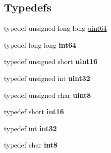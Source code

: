 \subsection*{Typedefs}
\begin{DoxyCompactItemize}
\item 
typedef unsigned long long \hyperlink{namespacedlib_a61113f8b6b3e4ccb66deca9355c8f65d}{uint64}
\item 
\hypertarget{namespacedlib_a8abf353ac58a13a17a60949929cc8a49}{
typedef long long {\bfseries int64}}
\label{namespacedlib_a8abf353ac58a13a17a60949929cc8a49}

\item 
\hypertarget{namespacedlib_a609c073ecd62413ae2c606909abf62be}{
typedef unsigned short {\bfseries uint16}}
\label{namespacedlib_a609c073ecd62413ae2c606909abf62be}

\item 
\hypertarget{namespacedlib_a9279fbd8989417f50695da06d93a7907}{
typedef unsigned int {\bfseries uint32}}
\label{namespacedlib_a9279fbd8989417f50695da06d93a7907}

\item 
\hypertarget{namespacedlib_a14f6e530a2dc0eceb5c7a0bd824c397c}{
typedef unsigned char {\bfseries uint8}}
\label{namespacedlib_a14f6e530a2dc0eceb5c7a0bd824c397c}

\item 
\hypertarget{namespacedlib_a0e2c448ebe0af3cab8fa8d405eb7da4d}{
typedef short {\bfseries int16}}
\label{namespacedlib_a0e2c448ebe0af3cab8fa8d405eb7da4d}

\item 
\hypertarget{namespacedlib_a65caa9f663f1fc46f3e05469e564b130}{
typedef int {\bfseries int32}}
\label{namespacedlib_a65caa9f663f1fc46f3e05469e564b130}

\item 
\hypertarget{namespacedlib_a61ac357a576a46e2de10f08ce050e3b3}{
typedef char {\bfseries int8}}
\label{namespacedlib_a61ac357a576a46e2de10f08ce050e3b3}

\end{DoxyCompactItemize}
